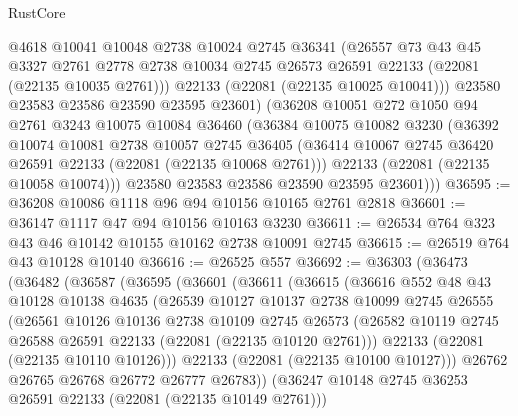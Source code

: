 \begin{lexlean}{RustCore}
\begin{coremodule}
          @4618
          @10041
          @10048
          @2738
          @10024
          @2745
          @36341
          (@26557
            @73
            @43
            @45
            @3327
            @2761
            @2778
            @2738
            @10034
            @2745
            @26573
            @26591
            @22133
            (@22081 (@22135 @10035 @2761)))
          @22133
          (@22081 (@22135 @10025 @10041)))
        @23580
        @23583
        @23586
        @23590
        @23595
        @23601)
      (@36208
        @10051
        @272
        @1050
        @94
        @2761
        @3243
        @10075
        @10084
        @36460
        (@36384
          @10075
          @10082
          @3230
          (@36392
            @10074
            @10081
            @2738
            @10057
            @2745
            @36405
            (@36414 @10067 @2745 @36420 @26591 @22133 (@22081 (@22135 @10068 @2761)))
            @22133
            (@22081 (@22135 @10058 @10074)))
          @23580
          @23583
          @23586
          @23590
          @23595
          @23601)))
@36595 := @36208 @10086 @1118 @96 @94 @10156 @10165 @2761 @2818
@36601 := @36147 @1117 @47 @94 @10156 @10163 @3230
@36611 := @26534 @764 @323 @43 @46 @10142 @10155 @10162 @2738 @10091 @2745
@36615 := @26519 @764 @43 @10128 @10140
@36616 := @26525 @557
@36692 := @36303
    (@36473
      (@36482
        (@36587
          (@36595
            (@36601
              (@36611
                (@36615
                  (@36616
                    @552
                    @48
                    @43
                    @10128
                    @10138
                    @4635
                    (@26539
                      @10127
                      @10137
                      @2738
                      @10099
                      @2745
                      @26555
                      (@26561
                        @10126
                        @10136
                        @2738
                        @10109
                        @2745
                        @26573
                        (@26582 @10119 @2745 @26588 @26591 @22133 (@22081 (@22135 @10120 @2761)))
                        @22133
                        (@22081 (@22135 @10110 @10126)))
                      @22133
                      (@22081 (@22135 @10100 @10127)))
                    @26762
                    @26765
                    @26768
                    @26772
                    @26777
                    @26783))
                (@36247 @10148 @2745 @36253 @26591 @22133 (@22081 (@22135 @10149 @2761)))

\end{coremodule}
\end{lexlean}
